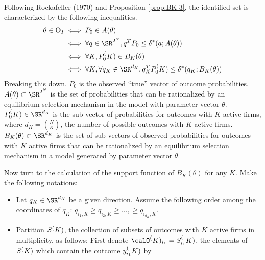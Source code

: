 Following Rockafeller (1970) and Proposition \ref{prop:BK-3}, the identified set is characterized by the following inequalities.
\begin{equation}
	\label{eq:BK-7}
	\begin{split}
	 	\theta \in \Theta_I &\iff P_0 \in A(\theta) \\ 
	 	&\iff \forall q\in \SR^{2^N}, q^T P_0 \leq \delta^*(a;A(\theta)) \\
	 	&\iff \forall K, P_0^\PK \in B_K(\theta) \\
	 	&\iff \forall K, \forall q_K \in \SR^{d_K}, q_K^T P_0^\PK \leq \delta^*(q_K;B_K(\theta))
	 \end{split} 	
\end{equation} 
Breaking this down. $P_0$ is the observed ``true'' vector of outcome probabilities. \(A(\theta) \subset \SR^{2^N}\) is the set of probabilities that can be rationalized by an equilibrium selection mechanism in the model with parameter vector $\theta$. $P_0^\PK \in \SR^{d_K}$ is the sub-vector of probabilities for outcomes with $K$ active firms, where $d_K = \binom{N}{K}$, the number of possible outcomes with $K$ active firms. $B_K(\theta) \subset \SR^{d_K}$ is the set of sub-vectors of observed probabilities for outcomes with $K$ active firms that can be rationalized by an equilibrium selection mechanism in a model generated by parameter vector $\theta$.

Now turn to the calculation of the support function of $B_K(\theta)$ for any $K$. Make the following notations:
\begin{itemize}
	\item  Let $q_K \in \SR^{d_K}$ be a given direction. Assume the following order among the coordinates of $q_K$: $q_{i_1,K} \geq q_{i_2,K} \geq \dots, \geq q_{i_{d_K},K}$. 
	\item Partition $S^(K)$, the collection of subsets of outcomes with $K$ active firms in multiplicity, as follows: First denote $\calO^\PK_{i_1} = S_{i_1}^\PK$, the elements of $S^(K)$ which contain the outcome $y_{i_1}^(K)$ by 
\end{itemize}

